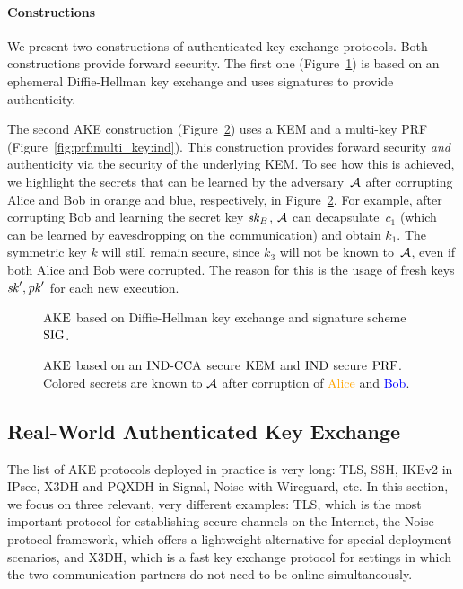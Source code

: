 \paragraph{Constructions}
We present two constructions of authenticated key exchange protocols.
Both constructions provide forward security.
The first one (Figure~\ref{fig:ake:signed_dh}) is based on an ephemeral Diffie-Hellman key exchange and uses signatures to provide authenticity.

The second AKE construction (Figure~\ref{fig:ake:kem}) uses a KEM and a multi-key PRF (Figure~\ref{fig:prf:multi_key:ind}). 
This construction provides forward security \emph{and} authenticity via the security of the underlying KEM.
To see how this is achieved, we highlight the secrets that can be learned by the adversary~$\mathcal{A}$ after corrupting Alice and Bob in orange and blue, respectively, in Figure~\ref{fig:ake:kem}.
For example, after corrupting Bob and learning the secret key $\mathit{sk}_B$, $\mathcal{A}$ can decapsulate~$c_1$ (which can be learned by eavesdropping on the communication) and obtain $k_1$.
The symmetric key $k$ will still remain secure, since $k_3$ will not be known to~$\mathcal{A}$, even if both Alice and Bob were corrupted.
The reason for this is the usage of fresh keys $\mathit{sk}',\mathit{pk}'$ for each new execution.

\begin{figure}[!ht]
    \centering
    
    \caption{$\mathrm{AKE}$ based on Diffie-Hellman key exchange and signature scheme $\mathrm{SIG}$.}
    \label{fig:ake:signed_dh}
\end{figure}

\begin{figure}[!ht]
    \centering
    
    \caption{$\mathrm{AKE}$ based on an ${\mathrm{IND}\text{-}\mathrm{CCA}}$ secure $\mathrm{KEM}$ and ${\mathrm{IND}}$ secure $\mathrm{PRF}$. Colored secrets are known to $\mathcal{A}$ after corruption of \textcolor{orange}{Alice} and \textcolor{blue}{Bob}.}
    \label{fig:ake:kem}
\end{figure}


\subsection{Real-World Authenticated Key Exchange}
The list of AKE protocols deployed in practice is very long: TLS, SSH, IKEv2 in IPsec, X3DH and PQXDH in Signal, Noise with Wireguard, etc.
In this section, we focus on three relevant, very different examples:
TLS, which is the most important protocol for establishing secure channels on the Internet,
the Noise protocol framework, which offers a lightweight alternative for special deployment scenarios,
and X3DH, which is a fast key exchange protocol for settings in which the two communication partners do not need to be online simultaneously.

